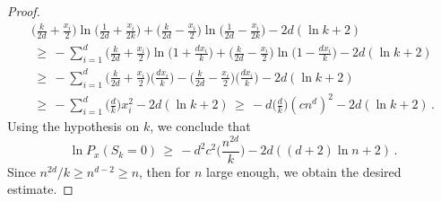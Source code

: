 \documentclass[AHL, Unicode, longabstracts, published]{cedram}
\begin{document}
\begin{proof}
\begin{multline*}
\Big(\displaystyle \frac{k}{2d}+\frac{x_i}{2}\Big)\ln
\Big(\frac{1}{2d}+\frac{x_i}{2k}\Big)+
\Big(\displaystyle \frac{k}{2d}-\frac{x_i}{2}\Big)\ln
\Big(\frac{1}{2d}-\frac{x_i}{2k}\Big) -2d(\ln k+2)\\
\,\geq\, -\sum_{i=1}^d
\Big(\displaystyle \frac{k}{2d}+\frac{x_i}{2}\Big)\ln
\Big({1}+\frac{dx_i}{k}\Big)+
\Big(\displaystyle \frac{k}{2d}-\frac{x_i}{2}\Big)\ln
\Big({1}-\frac{dx_i}{k}\Big) -2d(\ln k+2)\\
\,\geq\, -\sum_{i=1}^d
\Big(\displaystyle \frac{k}{2d}+\frac{x_i}{2}\Big)
\Big(\frac{dx_i}{k}\Big)-
\Big(\displaystyle \frac{k}{2d}-\frac{x_i}{2}\Big)
\Big(\frac{dx_i}{k}\Big) -2d(\ln k+2)\\
\,\geq\, -\sum_{i=1}^d
\Big(\frac{d}{k}\Big)x_i^2 -2d(\ln k+2)
\,\geq\, -d
\Big(\frac{d}{k}\Big)(cn^d)^2 -2d(\ln k+2)\,.
\end{multline*}
Using the hypothesis on $k$, we conclude that
\[
\ln P_x(S_{k}=0)\,\geq\,
-d^2c^2
\Big(\frac{n^{2d}}{k}\Big) -2d((d+2)\ln n+2)\,.
\]
Since $n^{2d}/k\geq n^{d-2}\geq n$, then for $n$ large enough, we obtain the desired estimate.
\end{proof}
\end{document}
